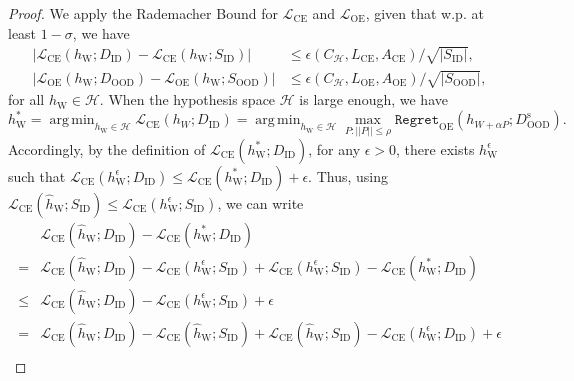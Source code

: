 \documentclass{article} \usepackage{iclr2022_conference,times}
\DeclareMathOperator*{\argmin}{arg\,min}
\begin{document}
\label{app: proof3} 
\begin{proof}
We apply the Rademacher Bound for $\mathcal{L}_\text{CE}$ and $\mathcal{L}_\text{OE}$, given that w.p. at least $1-\sigma$, we have 
\begin{align}
    \lvert{\mathcal{L}}_\text{CE}({h}_\text{W}; D_\text{ID})-{\mathcal{L}}_\text{CE}({h}_\text{W}; S_\text{ID}) \rvert & \le \epsilon(C_\mathcal{H}, L_\text{CE}, A_\text{CE})/\sqrt{\lvert S_\text{ID} \rvert}, \label{eq: rad_ce} \\
    \lvert{\mathcal{L}}_\text{OE}({h}_\text{W}; D_\text{OOD})-{\mathcal{L}}_\text{OE}({h}_\text{W}; S_\text{OOD}) \rvert & \le \epsilon(C_\mathcal{H}, L_\text{OE}, A_\text{OE})/\sqrt{\lvert S_\text{OOD} \rvert},  \label{eq: rad_oe}
\end{align}
for all $h_\text{W}\in\mathcal{H}$. When the hypothesis space $\mathcal{H}$ is large enough, we have 
\begin{equation}
    h_\text{W}^*=\argmin_{h_\text{W}\in\mathcal{H}}  {\mathcal{L}}_\text{CE}(h_W; D_\text{ID}) = \argmin_{h_\text{W}\in\mathcal{H}} \max_{P: \lvert\lvert P\rvert\rvert \le \rho} {\texttt{Regret}}_\text{OE}(h_{W+ \alpha P}; D^\text{s}_\text{OOD}).
\end{equation}
Accordingly, by the definition of ${\mathcal{L}}_\text{CE}({h}^*_\text{W}; D_\text{ID})$, for any $\epsilon>0$, there exists $h_\text{W}^\epsilon$ such that ${\mathcal{L}}_\text{CE}({h}^\epsilon_\text{W}; D_\text{ID})\le {\mathcal{L}}_\text{CE}({h}^*_\text{W}; D_\text{ID})+\epsilon$. Thus, using ${\mathcal{L}}_\text{CE}(\hat{h}_\text{W}; S_\text{ID})\le{\mathcal{L}}_\text{CE}({h}^\epsilon_\text{W}; S_\text{ID})$, we can write
\begin{align}
    & {\mathcal{L}}_\text{CE}(\hat{h}_\text{W}; D_\text{ID}) - {\mathcal{L}}_\text{CE}({h}^*_\text{W}; D_\text{ID}) \nonumber \\
    = & {\mathcal{L}}_\text{CE}(\hat{h}_\text{W}; D_\text{ID}) - {\mathcal{L}}_\text{CE}({h}^\epsilon_\text{W}; S_\text{ID}) + {\mathcal{L}}_\text{CE}({h}^\epsilon_\text{W}; S_\text{ID}) - {\mathcal{L}}_\text{CE}({h}^*_\text{W}; D_\text{ID}) \\
    \le & {\mathcal{L}}_\text{CE}(\hat{h}_\text{W}; D_\text{ID}) - {\mathcal{L}}_\text{CE}({h}^\epsilon_\text{W}; S_\text{ID}) + \epsilon \\
    = & {\mathcal{L}}_\text{CE}(\hat{h}_\text{W}; D_\text{ID}) - {\mathcal{L}}_\text{CE}(\hat{h}_\text{W}; S_\text{ID}) + {\mathcal{L}}_\text{CE}(\hat{h}_\text{W}; S_\text{ID}) - {\mathcal{L}}_\text{CE}({h}^\epsilon_\text{W}; D_\text{ID}) + \epsilon \\

\end{align}
\end{proof}
\end{document}
